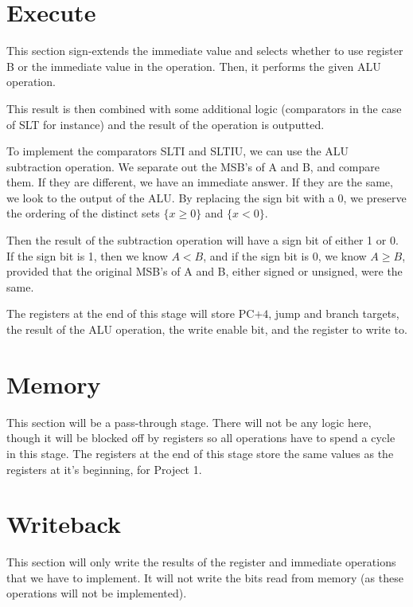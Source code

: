 \documentclass{article}
\begin{document}
\section*{Execute}
This section sign-extends the immediate value and selects whether to use register B or the immediate value in the operation.  Then, it performs the given ALU operation.

This result is then combined with some additional logic (comparators in the case of SLT for instance) and the result of the operation is outputted.

To implement the comparators SLTI and SLTIU, we can use the ALU subtraction operation. We separate out the MSB's of A and B, and compare them. If they are different, we have an immediate answer. If they are the same, we look to the output of the ALU. By replacing the sign bit with a 0, we preserve the ordering of the distinct sets $\{x \geq 0\}$ and $\{x < 0\}$. 

Then the result of the subtraction operation will have a sign bit of either 1 or 0. If the sign bit is 1, then we know $A < B$, and if the sign bit is 0, we know $A \geq B$, provided that the original MSB's of A and B, either signed or unsigned, were the same. 

The registers at the end of this stage will store PC$+4$, jump and branch targets, the result of the ALU operation, the write enable bit, and the register to write to.

\section*{Memory}
This section will be a pass-through stage. There will not be any logic here, though it will be blocked off by registers so all operations have to spend a cycle in this stage. The registers at the end of this stage store the same values as the registers at it's beginning, for Project 1. 

\section*{Writeback}
This section will only write the results of the register and immediate operations that we have to implement.  It will not write the bits read from memory (as these operations will not be implemented).
\end{document}
